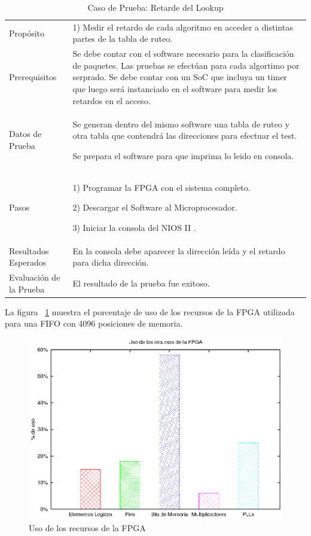 \begin{table}
	\begin{tabular}{|>{\columncolor[gray]{0.8}}l|p{9cm}|} \hline
\multicolumn{2}{|>{\columncolor[gray]{0.8}}l|}{\textbf{Caso de Prueba: Retardo de lookup }}\\ \hline
Propósito  & 1) Medir el retardo de cada algoritmo en acceder a distintas partes de la tabla de ruteo. 

\\ \hline
 Prerequisitos  & Se debe contar con el software necesario para la clasificación de paquetes. Las pruebas se efectúan para cada algortimo por serprado. Se debe contar con un SoC que incluya un timer que luego será instanciado en el software para medir los retardos en el acceso.
 \\ \hline
 Datos de Prueba & Se generan dentro del mismo software una tabla de ruteo y otra tabla que contendrá las direcciones para efectuar el test. 

Se prepara el software para que imprima lo leido en consola. 
 \\ \hline
 Pasos & 1) Programar la FPGA con el sistema completo.

2) Descargar el Software al Microprocesador. 

3) Iniciar la consola del NIOS II .
\\ \hline
 Resultados Esperados & En la consola debe aparecer la dirección leída y el retardo para dicha dirección. \\ \hline
 Evaluación de la Prueba  & El resultado de la prueba fue exitoso.\\ \hline
	\end{tabular}
	\caption{Caso de Prueba: Retarde del Lookup}
	\label{tab:retlook}
\end{table}

\newpage
La figura ~\ref{fig:fpga} muestra el porcentaje de uso de los recursos de la FPGA utilizada para una FIFO con 4096 posiciones de memoria.
\begin{figure}[H]
  \centering
	\includegraphics[scale=0.70]{4-implementacion/graf/fpga.eps}
  \caption{Uso de los recursos de la FPGA}
  \label{fig:fpga}
\end{figure}

